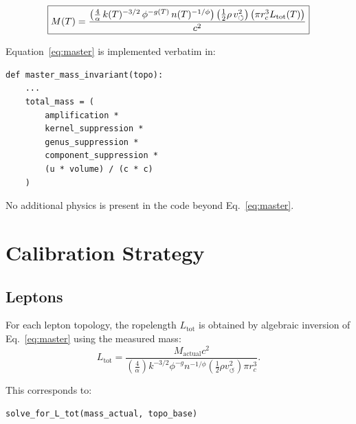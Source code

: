\documentclass[11pt,a4paper]{article}
\begin{document}
        \begin{equation}
            \boxed{%
                \strut
                M(T)
                =
                \dfrac{
                    \left(
                        \frac{4}{\alpha}
                        \, k(T)^{-3/2}
                        \, \phi^{-g(T)}
                        \, n(T)^{-1/\phi}
                    \right)
                    \left(\frac{1}{2}\rho\,v_{\circlearrowleft}^2\right)
                    \left(\pi r_c^3 L_{\text{tot}}(T)\right)
                }{
                    c^2
                }
            }
            \label{eq:master}
        \end{equation}

        Equation~\eqref{eq:master} is implemented verbatim in:
        \begin{verbatim}
def master_mass_invariant(topo):
    ...
    total_mass = (
        amplification *
        kernel_suppression *
        genus_suppression *
        component_suppression *
        (u * volume) / (c * c)
    )
        \end{verbatim}

        No additional physics is present in the code beyond Eq.~\eqref{eq:master}.

    \section{Calibration Strategy}

        \subsection{Leptons}

            For each lepton topology, the ropelength $L_{\text{tot}}$ is obtained
            by algebraic inversion of Eq.~\eqref{eq:master} using the measured mass:
            \begin{equation}
                L_{\text{tot}} =
                \frac{M_{\text{actual}} c^2}
                {
                    \left(\frac{4}{\alpha}\right)
                    k^{-3/2}
                    \phi^{-g}
                    n^{-1/\phi}
                    \left(\frac{1}{2}\rho v_{\circlearrowleft}^2\right)
                    \pi r_c^3
                }.
            \end{equation}

            This corresponds to:
            \begin{verbatim}
solve_for_L_tot(mass_actual, topo_base)
            \end{verbatim}
\end{document}
